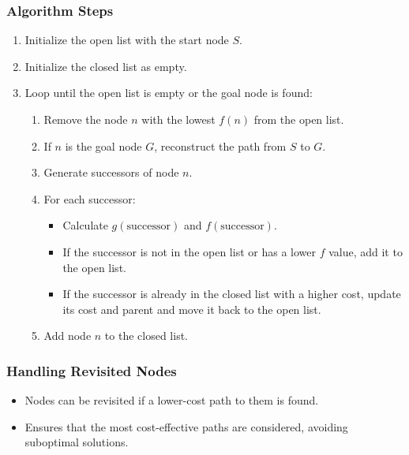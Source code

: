 \documentclass[8pt]{article}
\begin{document}
\subsubsection*{Algorithm Steps}
\begin{enumerate}
    \item Initialize the open list with the start node \( S \).
    \item Initialize the closed list as empty.
    \item Loop until the open list is empty or the goal node is found:
    \begin{enumerate}
        \item Remove the node \( n \) with the lowest \( f(n) \) from the open list.
        \item If \( n \) is the goal node \( G \), reconstruct the path from \( S \) to \( G \).
        \item Generate successors of node \( n \).
        \item For each successor:
        \begin{itemize}
            \item Calculate \( g(\text{successor}) \) and \( f(\text{successor}) \).
            \item If the successor is not in the open list or has a lower \( f \) value, add it to the open list.
            \item If the successor is already in the closed list with a higher cost, update its cost and parent and move it back to the open list.
        \end{itemize}
        \item Add node \( n \) to the closed list.
    \end{enumerate}
\end{enumerate}

\subsubsection*{Handling Revisited Nodes}
\begin{itemize}
    \item Nodes can be revisited if a lower-cost path to them is found.
    \item Ensures that the most cost-effective paths are considered, avoiding suboptimal solutions.
\end{itemize}
\end{document}
